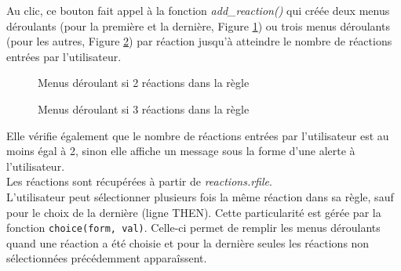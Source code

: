 Au clic, ce bouton fait appel à la fonction \emph{add\_reaction()} qui créée  deux menus déroulants (pour la première et la dernière, Figure \ref{menusDeroulants1}) ou trois menus déroulants (pour les autres, Figure \ref{menusDeroulants2}) par réaction jusqu'à atteindre le nombre de réactions entrées par l'utilisateur. 

\begin{figure}[!ht]
	\begin{center}
		\caption{Menus déroulant si 2 réactions dans la règle}
  		\label{menusDeroulants1}
  	\end{center}	
\end{figure}

\begin{figure}[!ht]
	\begin{center}
		\caption{Menus déroulant si 3 réactions dans la règle}
  		\label{menusDeroulants2}
  	\end{center}	
\end{figure}

Elle vérifie également que le nombre de réactions entrées par l'utilisateur est au moins égal à 2, sinon elle affiche un message sous la forme d'une alerte à l'utilisateur.\\
Les réactions sont récupérées à partir de \emph{reactions.rfile}.\\

L'utilisateur peut sélectionner plusieurs fois la m\^eme réaction dans sa règle, sauf pour le choix de la dernière (ligne THEN). Cette particularité est gérée par la fonction \texttt{choice(form, val)}. Celle-ci permet de remplir les menus déroulants quand une réaction a été choisie et pour la dernière seules les réactions non sélectionnées précédemment appara\^issent.

